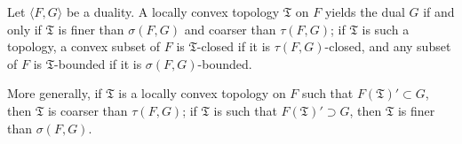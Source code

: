 Let $\langle F, G \rangle$ be a duality. A locally convex topology $\mathfrak{T}$ on $F$ yields the dual $G$ if and only if $\mathfrak{T}$ is finer than $\sigma(F, G)$ and coarser than $\tau(F, G)$; if $\mathfrak{T}$ is such a topology, a convex subset of $F$ is $\mathfrak{T}$-closed if it is $\tau(F, G)$-closed, and any subset of $F$ is $\mathfrak{T}$-bounded if it is $\sigma(F, G)$-bounded.

More generally, if $\mathfrak{T}$ is a locally convex topology on $F$ such that $F(\mathfrak{T})' \subset G$, then $\mathfrak{T}$ is coarser than $\tau(F, G)$; if $\mathfrak{T}$ is such that $F(\mathfrak{T})' \supset G$, then $\mathfrak{T}$ is finer than $\sigma(F, G)$.

